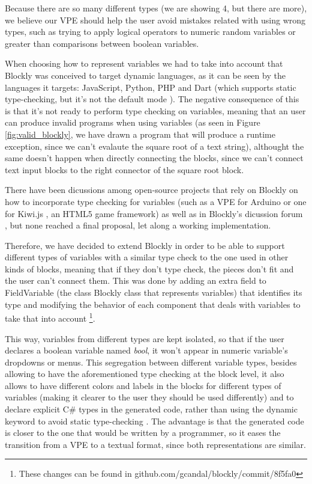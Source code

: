 Because there are so many different types (we are showing 4, but there are more),
we believe our VPE should help the user avoid mistakes related with using wrong
types, such as trying to apply logical operators to numeric random variables or
greater than comparisons between boolean variables.

When choosing how to represent variables we had to take into account that
Blockly was conceived to target dynamic languages, as it can be seen by the languages
it targets: JavaScript, Python, PHP and Dart (which supports static type-checking,
but it's not the default mode \cite{dart}). The negative consequence of this is that it's
not ready to perform type checking on variables, meaning that an user can
produce invalid programs when using variables (as seen in Figure \ref{fig:valid_blockly}, we have
drawn a program that will produce a runtime exception, since we can't evalaute
the square root of a text string), althought the same doesn't happen when
directly connecting the blocks, since we can't connect text input blocks to the
right connector of the square root block.

There have been dicussions among open-source projects that rely on Blockly on how
to incorporate type checking for variables (such as a VPE for Arduino \cite{bduino}
or one for Kiwi.js \cite{gbl}, an HTML5 game framework) as well as in Blockly's
dicussion forum \cite{gbl2}, but none reached a final proposal, let along a working
implementation.

Therefore, we have decided to extend Blockly in order to be able to support
different types of variables with a similar type check to the one used in other
kinds of blocks, meaning that if they don't type check, the pieces don't fit and the user
can't connect them. This was done by adding an extra field to FieldVariable
(the class Blockly class that represents variables) that identifies its type and
modifying the behavior of each component that deals with variables to take that
into account \footnote{These changes can be found in github.com/gcandal/blockly/commit/8f5fa0}.

This way, variables from different types are kept isolated, so that if the user
declares a boolean variable named \textit{bool}, it won't appear in numeric
variable's dropdowns or menus. This segregation between different variable types,
besides allowing to have the aforementioned type checking at the block level, it
also allows to have different colors and labels in the blocks for different types of variables
(making it clearer to the user they should be used differently) and to declare
explicit C# types in the generated code, rather than using
the dynamic keyword to avoid static type-checking \cite{cdyn}. The advantage is that
the generated code is closer to the one that would be written by a programmer,
so it eases the transition from a VPE to a textual format, since both representations
are similar.

